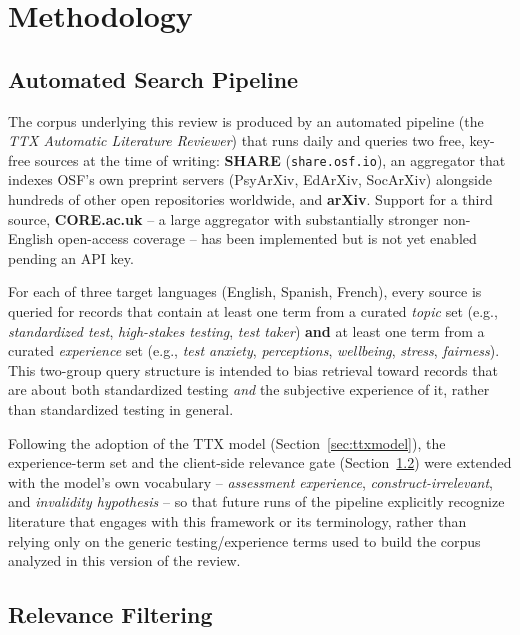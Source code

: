 \documentclass[11pt]{article}
\begin{document}
\section{Methodology}
\label{sec:methodology}

\subsection{Automated Search Pipeline}

The corpus underlying this review is produced by an automated pipeline (the \emph{TTX Automatic Literature Reviewer}) that runs daily and queries two free, key-free sources at the time of writing: \textbf{SHARE} (\texttt{share.osf.io}), an aggregator that indexes OSF's own preprint servers (PsyArXiv, EdArXiv, SocArXiv) alongside hundreds of other open repositories worldwide, and \textbf{arXiv}. Support for a third source, \textbf{CORE.ac.uk} -- a large aggregator with substantially stronger non-English open-access coverage -- has been implemented but is not yet enabled pending an API key.

For each of three target languages (English, Spanish, French), every source is queried for records that contain at least one term from a curated \emph{topic} set (e.g., \textit{standardized test}, \textit{high-stakes testing}, \textit{test taker}) \textbf{and} at least one term from a curated \emph{experience} set (e.g., \textit{test anxiety}, \textit{perceptions}, \textit{wellbeing}, \textit{stress}, \textit{fairness}). This two-group query structure is intended to bias retrieval toward records that are about both standardized testing \emph{and} the subjective experience of it, rather than standardized testing in general.

Following the adoption of the TTX model (Section~\ref{sec:ttxmodel}), the experience-term set and the client-side relevance gate (Section~\ref{sec:relevance}) were extended with the model's own vocabulary -- \textit{assessment experience}, \textit{construct-irrelevant}, and \textit{invalidity hypothesis} -- so that future runs of the pipeline explicitly recognize literature that engages with this framework or its terminology, rather than relying only on the generic testing/experience terms used to build the corpus analyzed in this version of the review.

\subsection{Relevance Filtering}
\label{sec:relevance}
\end{document}
